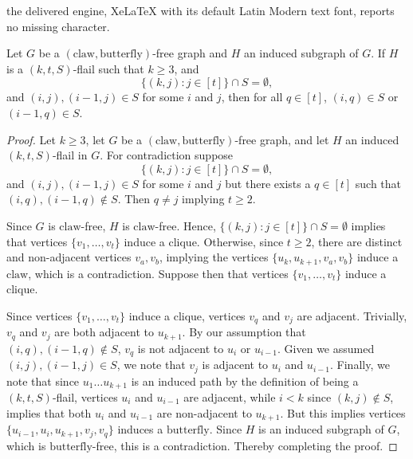 \documentclass[10pt,a4paper]{amsart}
\def\butterfly{\text{butterfly}}
\def\claw{\text{claw}}
\begin{document}
the delivered engine, XeLaTeX with its default Latin Modern text font, reports no missing character.
\begin{lemma}\label{Lemma: Flail claw,butterfly Lemma}
    Let $G$ be a $(\claw,\butterfly)$-free graph and $H$ an induced subgraph of $G$.
    If $H$ is a $(k,t,S)$-flail
    such that $k\geq 3$, and
    \[\{ (k,j): j \in [t]\} \cap S = \emptyset,\]
    and $(i,j),(i-1,j)\in S$ for some $i$ and $j$, then for all $q \in [t]$, $(i,q)\in S$ or $(i-1,q)\in S$.
\end{lemma}

\begin{proof}
    Let $k\geq 3$, 
    let $G$ be a $(\claw,\butterfly)$-free graph, and let $H$ an induced $(k,t,S)$-flail in $G$.
    For contradiction suppose
    \[\{ (k,j): j \in [t]\} \cap S = \emptyset,\]
    and $(i,j),(i-1,j)\in S$ for some $i$ and $j$ but there exists a $q \in [t]$ such that $(i,q),(i-1,q)\notin S$.
    Then $q\neq j$ implying $t \geq 2$.

    Since $G$ is $\claw$-free, $H$ is $\claw$-free. 
    Hence, $\{ (k,j): j \in [t]\} \cap S = \emptyset$ implies that 
    vertices $\{v_1,\dots, v_t\}$ induce a clique.
    Otherwise, since $t\geq 2$, there are distinct and non-adjacent vertices $v_a,v_b$, 
    implying the vertices $\{u_k,u_{k+1},v_a,v_b\}$ induce a $\claw$, which is a contradiction.
    Suppose then that
    vertices $\{v_1,\dots, v_t\}$ induce a clique.

    Since
    vertices $\{v_1,\dots, v_t\}$ induce a clique, vertices $v_q$ and $v_j$ are adjacent.
    Trivially, $v_q$ and $v_j$ are both adjacent to $u_{k+1}$.
    By our assumption that $(i,q),(i-1,q)\notin S$, $v_q$ is not adjacent to $u_i$ or $u_{i-1}$.
    Given we assumed  $(i,j),(i-1,j)\in S$, we note that $v_j$ is adjacent to $u_i$ and $u_{i-1}$.
    Finally, we note that since $u_1\dots u_{k+1}$ is an induced path by the definition of being a $(k,t,S)$-flail,
    vertices $u_i$ and $u_{i-1}$ are adjacent, while $i < k$ since $(k,j)\notin S$, implies that both $u_i$ and $u_{i-1}$ are non-adjacent to $u_{k+1}$.
    But this implies vertices $\{u_{i-1},u_i,u_{k+1},v_j,v_q\}$ induces a $\butterfly$.
    Since $H$ is an induced subgraph of $G$, which is $\butterfly$-free, this is a contradiction.
    Thereby completing the proof.
\end{proof}
\end{document}
